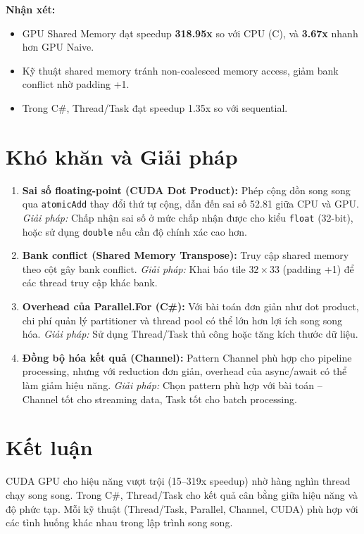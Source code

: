 \documentclass[12pt,a4paper]{article}
\begin{document}
\textbf{Nhận xét:}
\begin{itemize}[nosep]
    \item GPU Shared Memory đạt speedup \textbf{318.95x} so với CPU (C), và \textbf{3.67x} nhanh hơn GPU Naive.
    \item Kỹ thuật shared memory tránh non-coalesced memory access, giảm bank conflict nhờ padding +1.
    \item Trong C\#, Thread/Task đạt speedup 1.35x so với sequential.
\end{itemize}

\section{Khó khăn và Giải pháp}

\begin{enumerate}[nosep]
    \item \textbf{Sai số floating-point (CUDA Dot Product):} Phép cộng dồn song song qua \texttt{atomicAdd} thay đổi thứ tự cộng, dẫn đến sai số 52.81 giữa CPU và GPU. \textit{Giải pháp:} Chấp nhận sai số ở mức chấp nhận được cho kiểu \texttt{float} (32-bit), hoặc sử dụng \texttt{double} nếu cần độ chính xác cao hơn.

    \item \textbf{Bank conflict (Shared Memory Transpose):} Truy cập shared memory theo cột gây bank conflict. \textit{Giải pháp:} Khai báo tile $32 \times 33$ (padding +1) để các thread truy cập khác bank.

    \item \textbf{Overhead của Parallel.For (C\#):} Với bài toán đơn giản như dot product, chi phí quản lý partitioner và thread pool có thể lớn hơn lợi ích song song hóa. \textit{Giải pháp:} Sử dụng Thread/Task thủ công hoặc tăng kích thước dữ liệu.

    \item \textbf{Đồng bộ hóa kết quả (Channel):} Pattern Channel phù hợp cho pipeline processing, nhưng với reduction đơn giản, overhead của async/await có thể làm giảm hiệu năng. \textit{Giải pháp:} Chọn pattern phù hợp với bài toán -- Channel tốt cho streaming data, Task tốt cho batch processing.
\end{enumerate}

\section*{Kết luận}
CUDA GPU cho hiệu năng vượt trội (15--319x speedup) nhờ hàng nghìn thread chạy song song. Trong C\#, Thread/Task cho kết quả cân bằng giữa hiệu năng và độ phức tạp. Mỗi kỹ thuật (Thread/Task, Parallel, Channel, CUDA) phù hợp với các tình huống khác nhau trong lập trình song song.
\end{document}
